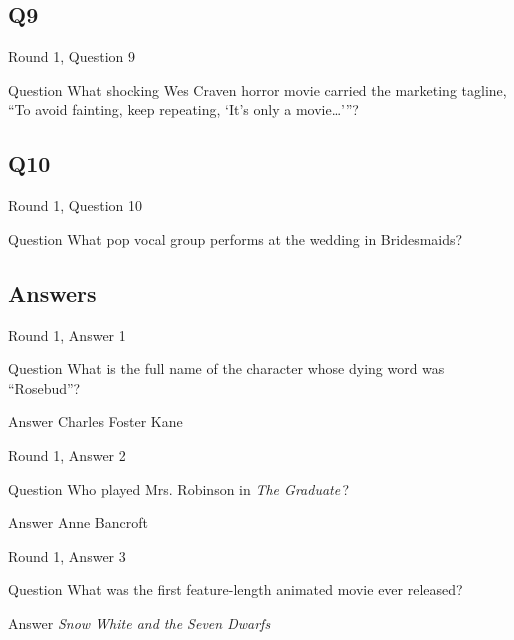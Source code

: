 \documentclass[11pt]{beamer}
\begin{document}
\subsection*{Q9}
\begin{frame}[t]{Round 1, Question 9}
\vspace{2em}
\begin{block}{Question}
What shocking Wes Craven horror movie carried the marketing tagline, ``To avoid fainting, keep repeating, `It's only a movie…'{}''?
\end{block}
\end{frame}
    

\subsection*{Q10}
\begin{frame}[t]{Round 1, Question 10}
\vspace{2em}
\begin{block}{Question}
What pop vocal group performs at the wedding in Bridesmaids?
\end{block}
\end{frame}
    
\subsection{Answers}

\begin{frame}[t]{Round 1, Answer 1}
\vspace{2em}
\begin{block}{Question}
What is the full name of the character whose dying word was ``Rosebud''?
\end{block}
\pause{}
\begin{block}{Answer}
Charles Foster Kane
\end{block}
\end{frame}
    

\begin{frame}[t]{Round 1, Answer 2}
\vspace{2em}
\begin{block}{Question}
Who played Mrs. Robinson in \emph{The Graduate}\,?
\end{block}
\pause{}
\begin{block}{Answer}
Anne Bancroft
\end{block}
\end{frame}
    

\begin{frame}[t]{Round 1, Answer 3}
\vspace{2em}
\begin{block}{Question}
What was the first feature-length animated movie ever released?
\end{block}
\pause{}
\begin{block}{Answer}
\emph{Snow White and the Seven Dwarfs}
\end{block}
\end{frame}
    
\end{document}
